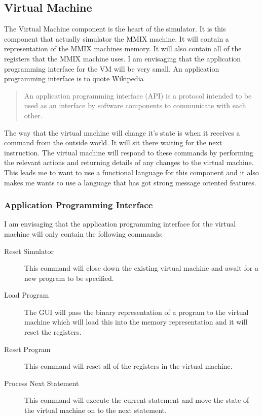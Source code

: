 \documentclass[11pt]{article} %
\begin{document}
\subsection{Virtual Machine}
\label{sec:VM}
The Virtual Machine component is the heart of the simulator.  It is this component that actually simulator the MMIX machine.  It will contain a representation of the MMIX machines memory. It will also contain all of the registers that the MMIX machine uses. I am envisaging that the application programming interface for the VM will be very small. An application programming interface is to quote Wikipedia~\cite{ref:api}
\begin{quote}
	An application programming interface (API) is a protocol intended to be used as an interface by software components to communicate with each other.
\end{quote}

The way that the virtual machine will change it's state is when it receives a command from the outside world. It will sit there waiting for the next instruction. The virtual machine will respond to these commands by performing the relevant actions and returning details of any changes to the virtual machine.  This leads me to want to use a functional language for this component and it also makes me wants to use a language that has got strong message oriented features.

\subsubsection{Application Programming Interface}
I am envisaging that the application programming interface for the virtual machine will only contain the following commands:

\begin{description}
	\item[Reset Simulator] This command will close down the existing virtual machine and await for a new program to be specified.
	\item[Load Program] The GUI will pass the binary representation of a program to the virtual machine which will load this into the memory representation and it will reset the registers.
	\item[Reset Program] This command will reset all of the registers in the virtual machine.
	\item[Process Next Statement] This command will execute the current statement and move the state of the virtual machine on to the next statement.
\end{description}
\end{document}
